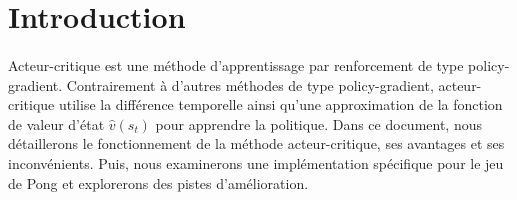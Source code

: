 \section{Introduction}

\paragraph{}
Acteur-critique est une méthode d'apprentissage par renforcement de type policy-gradient.
Contrairement à d'autres méthodes de type policy-gradient, acteur-critique utilise la 
différence temporelle ainsi qu'une approximation de la fonction de valeur d'état $\hat{v}(s_t)$
pour apprendre la politique. Dans ce document,
nous détaillerons le fonctionnement de la méthode acteur-critique,
ses avantages et ses inconvénients. Puis,
nous examinerons une implémentation spécifique pour le jeu de Pong et explorerons des pistes d'amélioration.

